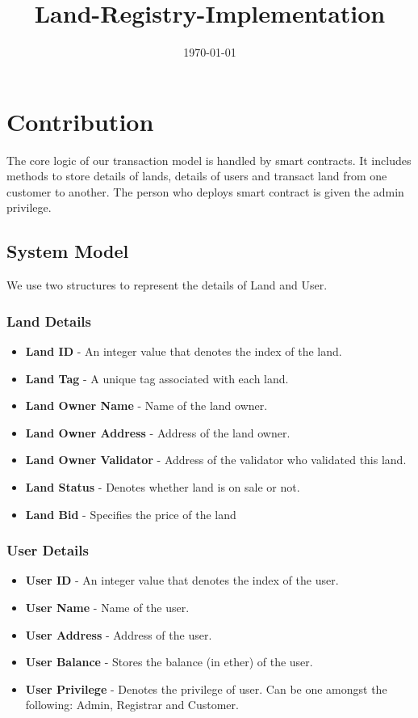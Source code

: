 \documentclass[11pt]{article}
\date{\today}
\title{Land-Registry-Implementation}
\begin{document}
\maketitle

\section{Contribution}
\label{sec:org5b365a2}
The core logic of our transaction model is handled by smart contracts. It includes methods to store details of lands, details of users and transact land from one customer to another. The person who deploys smart contract is given the admin privilege.     
\subsection{System Model}
\label{sec:org026fd27}
We use two structures to represent the details of Land and User.
\subsubsection{Land Details}
\label{sec:orgcb39089}
\begin{itemize}
\item \textbf{Land ID} - An integer value that denotes the index of the land.
\item \textbf{Land Tag} - A unique tag associated with each land.
\item \textbf{Land Owner Name} - Name of the land owner.
\item \textbf{Land Owner Address} - Address of the land owner.
\item \textbf{Land Owner Validator} - Address of the validator who validated this land.
\item \textbf{Land Status} - Denotes whether land is on sale or not.
\item \textbf{Land Bid} - Specifies the price of the land
\end{itemize}

\subsubsection{User Details}
\label{sec:orgea80691}
\begin{itemize}
\item \textbf{User ID} - An integer value that denotes the index of the user.
\item \textbf{User Name} - Name of the user.
\item \textbf{User Address} - Address of the user.
\item \textbf{User Balance} - Stores the balance (in ether) of the user.
\item \textbf{User Privilege} - Denotes the privilege of user. Can be one amongst the following: Admin, Registrar and Customer.
\end{itemize}
\end{document}
